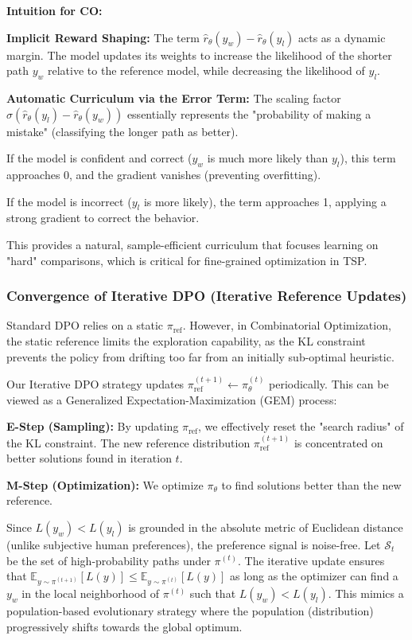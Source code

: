 \documentclass{article}
\theoremstyle{plain}
\theoremstyle{definition}
\theoremstyle{remark}
\begin{document}
\textbf{Intuition for CO:}

\textbf{Implicit Reward Shaping:} The term $\hat{r}_\theta(y_w) - \hat{r}_\theta(y_l)$ acts as a dynamic margin. The model updates its weights to increase the likelihood of the shorter path $y_w$ relative to the reference model, while decreasing the likelihood of $y_l$.

\textbf{Automatic Curriculum via the Error Term:} The scaling factor $\sigma(\hat{r}_\theta(y_l) - \hat{r}_\theta(y_w))$ essentially represents the "probability of making a mistake" (classifying the longer path as better).

If the model is confident and correct ($y_w$ is much more likely than $y_l$), this term approaches 0, and the gradient vanishes (preventing overfitting).

If the model is incorrect ($y_l$ is more likely), the term approaches 1, applying a strong gradient to correct the behavior.

This provides a natural, sample-efficient curriculum that focuses learning on "hard" comparisons, which is critical for fine-grained optimization in TSP.


\subsubsection{Convergence of Iterative DPO (Iterative Reference Updates)}

Standard DPO relies on a static $\pi_{\text{ref}}$. However, in Combinatorial Optimization, the static reference limits the exploration capability, as the KL constraint prevents the policy from drifting too far from an initially sub-optimal heuristic.



Our Iterative DPO strategy updates $\pi_{\text{ref}}^{(t+1)} \leftarrow \pi_{\theta}^{(t)}$ periodically. This can be viewed as a Generalized Expectation-Maximization (GEM) process:

\textbf{E-Step (Sampling):} By updating $\pi_{\text{ref}}$, we effectively reset the "search radius" of the KL constraint. The new reference distribution $\pi_{\text{ref}}^{(t+1)}$ is concentrated on better solutions found in iteration $t$.

\textbf{M-Step (Optimization):} We optimize $\pi_\theta$ to find solutions better than the new reference.

Since $L(y_w) < L(y_l)$ is grounded in the absolute metric of Euclidean distance (unlike subjective human preferences), the preference signal is noise-free.
Let $\mathcal{S}_t$ be the set of high-probability paths under $\pi^{(t)}$. The iterative update ensures that $\mathbb{E}_{y \sim \pi^{(t+1)}}[L(y)] \leq \mathbb{E}_{y \sim \pi^{(t)}}[L(y)]$ as long as the optimizer can find a $y_w$ in the local neighborhood of $\pi^{(t)}$ such that $L(y_w) < L(y_l)$. This mimics a population-based evolutionary strategy where the population (distribution) progressively shifts towards the global optimum.
\end{document}
